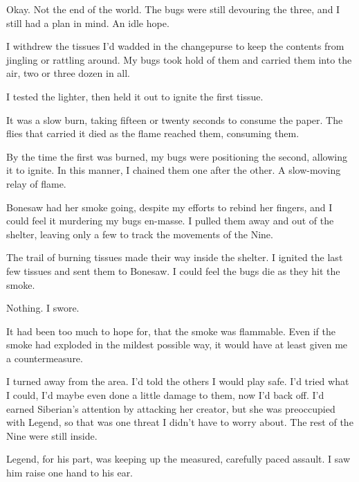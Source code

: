 Okay.  Not the end of the world.  The bugs were still devouring the three, and I still had a plan in mind.  An idle hope.



I withdrew the tissues I'd wadded in the changepurse to keep the contents from jingling or rattling around.  My bugs took hold of them and carried them into the air, two or three dozen in all.



I tested the lighter, then held it out to ignite the first tissue.



It was a slow burn, taking fifteen or twenty seconds to consume the paper.  The flies that carried it died as the flame reached them, consuming them.



By the time the first was burned, my bugs were positioning the second, allowing it to ignite.  In this manner, I chained them one after the other.  A slow-moving relay of flame.



Bonesaw had her smoke going, despite my efforts to rebind her fingers, and I could feel it murdering my bugs en-masse.  I pulled them away and out of the shelter, leaving only a few to track the movements of the Nine.



The trail of burning tissues made their way inside the shelter.  I ignited the last few tissues and sent them to Bonesaw.  I could feel the bugs die as they hit the smoke.



Nothing.  I swore.



It had been too much to hope for, that the smoke was flammable.  Even if the smoke had exploded in the mildest possible way, it would have at least given me a countermeasure.



I turned away from the area.  I'd told the others I would play safe.  I'd tried what I could, I'd maybe even done a little damage to them, now I'd back off.  I'd earned Siberian's attention by attacking her creator, but she was preoccupied with Legend, so that was one threat I didn't have to worry about.  The rest of the Nine were still inside.



Legend, for his part, was keeping up the measured, carefully paced assault.  I saw him raise one hand to his ear.



